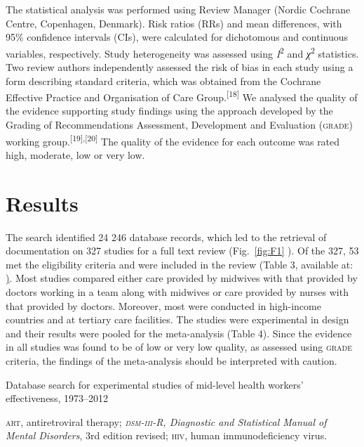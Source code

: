 \documentclass{article}
\begin{document}
The statistical analysis was performed using Review Manager (Nordic Cochrane
Centre, Copenhagen,
Denmark). Risk ratios (RRs) and mean differences, with 95\% confidence intervals
(CIs), were
calculated for dichotomous and continuous variables, respectively. Study
heterogeneity was assessed
using \textit{I}\textsuperscript{2}
and \textit{χ}\textsuperscript{2}
statistics. Two
review authors independently assessed the risk of bias in each study using a
form describing
standard criteria, which was obtained from the Cochrane Effective Practice and
Organisation of Care
Group.\textsuperscript{[}\textsuperscript{18}\textsuperscript{]}
We analysed the quality of the evidence
supporting study findings using the approach developed by the Grading of
Recommendations Assessment,
Development and Evaluation (\textsc{grade}) working
group.\textsuperscript{[}\textsuperscript{19}\textsuperscript{]}\textsuperscript{,}\textsuperscript{[}\textsuperscript{20}\textsuperscript{]}
The quality of
the evidence for each outcome was rated high, moderate, low or very low.

\section{Results}

The search identified 24 246 database records, which led to the retrieval of
documentation
on 327 studies for a full text review (Fig.~\ref{fig:F1}
). Of the
327, 53 met the eligibility criteria and were included in the review (Table 3,
available at: \href{http://www.who.int/bulletin/volumes/91/11/13-118786}). Most
studies compared either care
provided by midwives with that provided by doctors working in a team along with
midwives or care
provided by nurses with that provided by doctors. Moreover, most were conducted
in high-income
countries and at tertiary care facilities. The studies were experimental in
design and their results
were pooled for the meta-analysis (Table 4). Since the
evidence in all studies was found to be of low or very low quality, as assessed
using \textsc{grade}
criteria, the findings of the meta-analysis should be interpreted with caution.

Database search for experimental studies of mid-level health workers'
effectiveness,
1973–2012

\textsc{art}, antiretroviral therapy; \textit{\textsc{dsm}-\textsc{iii}-R, Diagnostic and Statistical
Manual of Mental
Disorders}, 3rd edition revised; \textsc{hiv}, human immunodeficiency virus.
\end{document}
